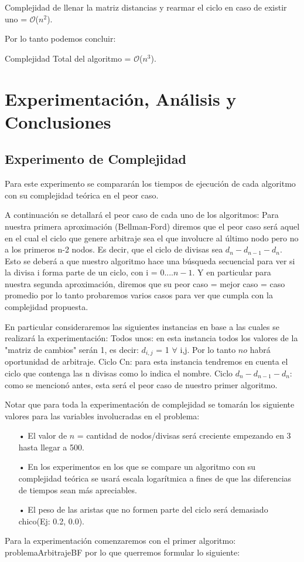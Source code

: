 \documentclass[11pt,a4paper]{article}
\begin{document}
Complejidad de llenar la matriz distancias y rearmar el ciclo en caso de existir uno = $\mathcal{O}$($n^{2}$).

Por lo tanto podemos concluir:

Complejidad Total del algoritmo = $\mathcal{O}$($n^{3}$).

\pagebreak
\section{Experimentaci\'on, An\'alisis y Conclusiones}
\subsection{Experimento de Complejidad}
Para este experimento se comparar\'an los tiempos de ejecuci\'on de cada algoritmo con su complejidad te\'orica en el peor caso.

A continuaci\'on se detallar\'a el peor caso de cada uno de los algoritmos:
Para nuestra primera aproximaci\'on (Bellman-Ford) diremos que el peor caso ser\'a aquel en el cual el ciclo que genere arbitraje sea el que involucre al \'ultimo nodo pero no a los primeros n-2 nodos. Es decir, que el ciclo de divisas sea $d_{n}-d_{n-1}-d_{n}$. Esto se deber\'a a que nuestro algoritmo hace una b\'usqueda secuencial para ver si la divisa i forma parte de un ciclo, con i = $0....n-1$.
Y en particular para nuestra segunda aproximaci\'on, diremos que su peor caso = mejor caso = caso promedio por lo tanto probaremos varios casos para ver que cumpla con la complejidad propuesta.

En particular consideraremos las siguientes instancias en base a las cuales se realizar\'a la experimentaci\'on:
Todos unos: en esta instancia todos los valores de la "matriz de cambios"  ser\'an 1, es decir: $d_{i,j}$ = 1 $\forall$ i,j. Por lo tanto $no$ habr\'a oportunidad de arbitraje.
Ciclo Cn: para esta instancia tendremos en cuenta el ciclo que contenga las n divisas como lo indica el nombre.
Ciclo $d_{n}-d_{n-1}-d_{n}$: como se mencion\'o antes, esta ser\'a el peor caso de nuestro primer algoritmo.

Notar que para toda la experimentaci\'on de complejidad se tomar\'an los siguiente valores para las variables involucradas en el problema:
\begin{itemize}
    \item[•] El valor de $n$ = cantidad de nodos/divisas ser\'a creciente empezando en 3 hasta llegar a 500.
    \item[•] En los experimentos en los que se compare un algoritmo con su complejidad te\'orica se usar\'a escala logar\'itmica a fines de que las diferencias de tiempos sean m\'as apreciables.
    \item[•] El peso de las aristas que no formen parte del ciclo ser\'a demasiado chico(Ej: 0.2, 0.0).
\end{itemize}
Para la experimentaci\'on comenzaremos con el primer algoritmo: problemaArbitrajeBF por lo que querremos formular lo siguiente:
\end{document}
